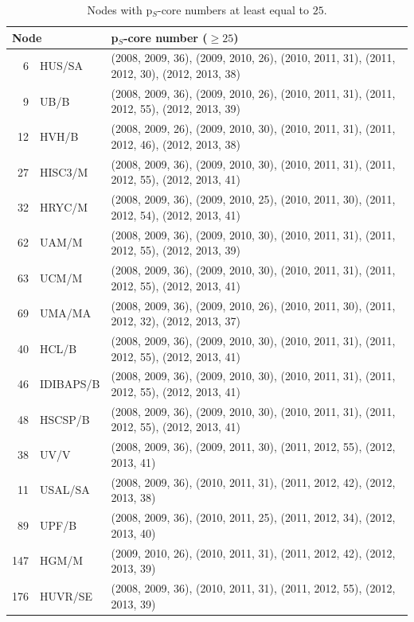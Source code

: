 \documentclass[a4paper,twoside,10pt]{article}
\begin{document}
\begin{center}
\begin{longtable}{rlp{8.5cm}}
\caption{Nodes with p$_S$-core numbers at least equal to $25.$}
\label{stemcellpscore25}\\
 \multicolumn{2}{l}{\textbf{Node}} & \textbf{p$_S$-core number} ($\geq 25$) \\
 \endhead
  6 & HUS/SA       &(2008, 2009, 36), (2009, 2010, 26), (2010, 2011, 31), (2011, 2012, 30), (2012, 2013, 38)\\
  9 & UB/B         &(2008, 2009, 36), (2009, 2010, 26), (2010, 2011, 31), (2011, 2012, 55), (2012, 2013, 39)\\
 12 & HVH/B        &(2008, 2009, 26), (2009, 2010, 30), (2010, 2011, 31), (2011, 2012, 46), (2012, 2013, 38)\\
 27 & HISC3/M      &(2008, 2009, 36), (2009, 2010, 30), (2010, 2011, 31), (2011, 2012, 55), (2012, 2013, 41)\\
 32 & HRYC/M       &(2008, 2009, 36), (2009, 2010, 25), (2010, 2011, 30), (2011, 2012, 54), (2012, 2013, 41)\\
 62 & UAM/M        &(2008, 2009, 36), (2009, 2010, 30), (2010, 2011, 31), (2011, 2012, 55), (2012, 2013, 39)\\
 63 & UCM/M        &(2008, 2009, 36), (2009, 2010, 30), (2010, 2011, 31), (2011, 2012, 55), (2012, 2013, 41)\\
 69 & UMA/MA       &(2008, 2009, 36), (2009, 2010, 26), (2010, 2011, 30), (2011, 2012, 32), (2012, 2013, 37)\\
 40 & HCL/B        &(2008, 2009, 36), (2009, 2010, 30), (2010, 2011, 31), (2011, 2012, 55), (2012, 2013, 41)\\
 46 & IDIBAPS/B    &(2008, 2009, 36), (2009, 2010, 30), (2010, 2011, 31), (2011, 2012, 55), (2012, 2013, 41)\\
 48 & HSCSP/B      &(2008, 2009, 36), (2009, 2010, 30), (2010, 2011, 31), (2011, 2012, 55), (2012, 2013, 41)\\
 38 & UV/V         &(2008, 2009, 36), (2009, 2011, 30), (2011, 2012, 55), (2012, 2013, 41)\\
 11 & USAL/SA      &(2008, 2009, 36), (2010, 2011, 31), (2011, 2012, 42), (2012, 2013, 38)\\
 89 & UPF/B        &(2008, 2009, 36), (2010, 2011, 25), (2011, 2012, 34), (2012, 2013, 40)\\
147 & HGM/M        &(2009, 2010, 26), (2010, 2011, 31), (2011, 2012, 42), (2012, 2013, 39)\\
176 & HUVR/SE      &(2008, 2009, 36), (2010, 2011, 31), (2011, 2012, 55), (2012, 2013, 39)\\

\end{longtable}
\end{center}
\end{document}
